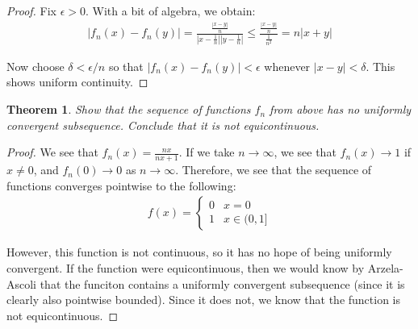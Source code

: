 \documentclass[psamsfonts]{amsart}
\newtheorem{thm}{Theorem}[section]
\theoremstyle{definition}
\theoremstyle{remark}
\numberwithin{equation}{section}
\begin{document}
\begin{proof}
Fix $\epsilon > 0$. With a bit of algebra, we obtain:
\begin{eqnarray}
|f_n(x) - f_n(y)| = \frac{ \frac{|x-y|}{n}}{|x- \frac{1}{n}| |y - \frac{1}{n}|} \leq \frac{ \frac{|x-y|}{n}}{\frac{1}{n^2}} = n |x+y|
\end{eqnarray}

Now choose $\delta < \epsilon/n$ so that $|f_n(x) - f_n(y)| < \epsilon$ whenever $|x-y| < \delta$. This shows uniform continuity.
\end{proof}

\begin{thm}
Show that the sequence of functions $f_n$ from above has no uniformly convergent subsequence. Conclude that it is not equicontinuous. 
\end{thm}

\begin{proof}
We see that $f_n(x) = \frac{nx}{nx+1}$. If we take $n \to \infty$, we see that $f_n(x) \to 1$ if $x \neq 0$, and $f_n(0) \to 0$ as $n \to \infty$. Therefore, we see that the sequence of functions converges pointwise to the following:
\begin{eqnarray}
f(x) = \left\{ \begin{array}{ll}
0 & x = 0 \\
1 & x \in (0,1]
\end{array} \right.
\end{eqnarray}

However, this function is not continuous, so it has no hope of being uniformly convergent. If the function were equicontinuous, then we would know by Arzela-Ascoli that the funciton contains a uniformly convergent subsequence (since it is clearly also pointwise bounded). Since it does not, we know that the function is not equicontinuous.
\end{proof}
\end{document}
